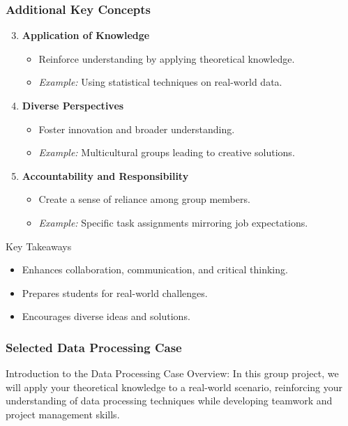 \documentclass[aspectratio=169]{beamer}
\begin{document}
\begin{frame}[fragile]
    \frametitle{Additional Key Concepts}
    \begin{enumerate}
        \setcounter{enumi}{2}
        \item \textbf{Application of Knowledge}
            \begin{itemize}
                \item Reinforce understanding by applying theoretical knowledge.
                \item \textit{Example:} Using statistical techniques on real-world data.
            \end{itemize}
        \item \textbf{Diverse Perspectives}
            \begin{itemize}
                \item Foster innovation and broader understanding.
                \item \textit{Example:} Multicultural groups leading to creative solutions.
            \end{itemize}
        \item \textbf{Accountability and Responsibility}
            \begin{itemize}
                \item Create a sense of reliance among group members.
                \item \textit{Example:} Specific task assignments mirroring job expectations.
            \end{itemize}
    \end{enumerate}

    \begin{block}{Key Takeaways}
        \begin{itemize}
            \item Enhances collaboration, communication, and critical thinking.
            \item Prepares students for real-world challenges.
            \item Encourages diverse ideas and solutions.
        \end{itemize}
    \end{block}
\end{frame}

\begin{frame}[fragile]
    \frametitle{Selected Data Processing Case}
    \begin{block}{Introduction to the Data Processing Case}
        Overview: In this group project, we will apply your theoretical knowledge to a real-world scenario, reinforcing your understanding of data processing techniques while developing teamwork and project management skills.
    \end{block}
\end{frame}
\end{document}
